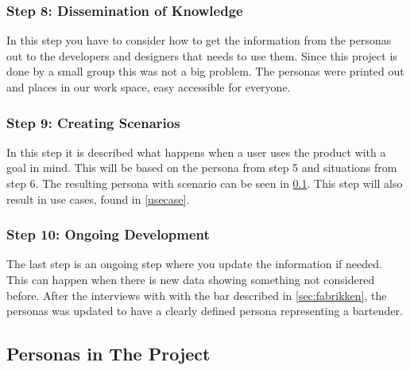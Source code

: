 \subsubsection{Step 8: Dissemination of Knowledge}
In this step you have to consider how to get the information from the personas out to the developers and designers that needs to use them. Since this project is done by a small group this was not a big problem. The personas were printed out and places in our work space, easy accessible for everyone.

\subsubsection{Step 9: Creating Scenarios}
In this step it is described what happens when a user uses the product with a goal in mind. This will be based on the persona from step 5 and situations from step 6. The resulting persona with scenario can be seen in \cref{akkpersona}. This step will also result in use cases, found in \cref{usecase}.

\subsubsection{Step 10: Ongoing Development}
The last step is an ongoing step where you update the information if needed. This can happen when there is new data showing something not considered before. After the interviews with with the bar described in \cref{sec:fabrikken}, the personas was updated to have a clearly defined persona representing a bartender.

\subsection{Personas in The Project}
\label{akkpersona}



